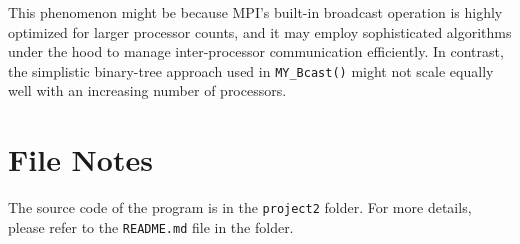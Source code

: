 \documentclass[12pt,a4paper]{article}
\begin{document}
This phenomenon might be because MPI's built-in broadcast operation is 
 highly optimized for larger processor counts, 
 and it may employ sophisticated algorithms under the hood to 
 manage inter-processor communication efficiently. 
In contrast, 
 the simplistic binary-tree approach used in \texttt{MY\_Bcast()} might
 not scale equally well with an increasing number of processors.

\section*{File Notes}
The source code of the program is in the \texttt{project2} folder. 
For more details, please refer to the \texttt{README.md} file in the folder.
\end{document}

